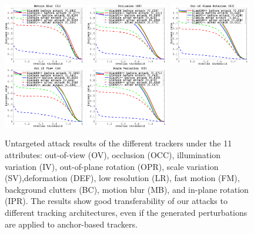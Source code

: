 \documentclass[journal]{IEEEtran}
\begin{document}
\begin{figure}[t!]
\begin{center}
    \includegraphics[width=0.32\textwidth]{images_imperceptible/OTB2015/success_plot_OPE_OTB100_MB.png}
    \includegraphics[width=0.32\textwidth]{images_imperceptible/OTB2015/success_plot_OPE_OTB100_OCC.png}
    \includegraphics[width=0.32\textwidth]{images_imperceptible/OTB2015/success_plot_OPE_OTB100_OPR.png}
    \includegraphics[width=0.32\textwidth]{images_imperceptible/OTB2015/success_plot_OPE_OTB100_OV.png}
    \includegraphics[width=0.32\textwidth]{images_imperceptible/OTB2015/success_plot_OPE_OTB100_SV.png}
  \end{center}
      \caption{Untargeted attack results of the different trackers under the 11 attributes: out-of-view (OV), occlusion (OCC), illumination variation (IV), out-of-plane rotation (OPR), scale variation (SV),deformation (DEF), low resolution (LR), fast motion (FM), background clutters (BC), motion blur (MB), and in-plane rotation (IPR). The results show good transferability of our attacks to different tracking architectures, even if the generated perturbations are applied to anchor-based trackers.}
  \label{fig:attr}
\end{figure}
\end{document}

